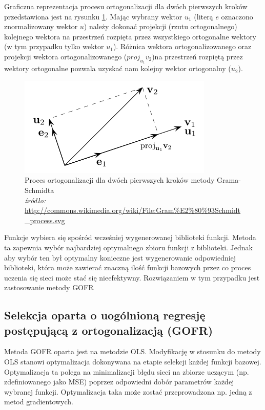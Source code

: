 Graficzna reprezentacja procesu ortogonalizacji dla dwóch pierwszych kroków przedstawiona jest na rysunku \ref{fig:gram}. Mając wybrany wektor $u_1$ (literą $e$ oznaczono znormalizowany wektor $u$) należy dokonać projekcji (rzutu ortogonalnego) kolejnego wektora na przestrzeń rozpięta przez wszystkiego ortogonalne wektory (w tym przypadku tylko wektor $u_1$). Różnica wektora ortogonalizowanego oraz projekcji wektora ortogonalizowanego ($proj_{u_1}v_2$)na przestrzeń rozpiętą przez wektory ortogonalne pozwala uzyskać nam kolejny wektor ortogonalny ($u_2$).
\begin{figure}[ht!]
	\centering
	
	\includegraphics[scale=0.7]{images/GramSchmidt.png}
	\caption{Proces ortogonalizacji dla dwóch pierwszych kroków metody Grama-Schmidta \\
	\footnotesize {\textit{źródło:} \url{http://commons.wikimedia.org/wiki/File:Gram\%E2\%80\%93Schmidt\_process.svg}}}
	\label{fig:gram}	

\end{figure}

Funkcje wybiera się spośród wcześniej wygenerowanej biblioteki funkcji. Metoda ta zapewnia wybór najbardziej optymalnego zbioru funkcji z biblioteki. Jednak aby wybór ten był optymalny konieczne jest wygenerowanie odpowiedniej biblioteki, która może zawierać znaczną ilość funkcji bazowych przez co proces uczenia się sieci może stać się nieefektywny. Rozwiązaniem w tym przypadku jest zastosowanie metody GOFR

\subsection{Selekcja oparta o uogólnioną regresję postępującą z ortogonalizacją (GOFR)}
Metoda GOFR oparta jest na metodzie OLS\cite{Duboisa}. Modyfikację w stosunku do metody OLS stanowi optymalizacja dokonywana na etapie selekcji każdej funkcji bazowej. Optymalizacja ta polega na minimalizacji błędu sieci na zbiorze uczącym (np. zdefiniowanego jako MSE) poprzez odpowiedni dobór parametrów każdej wybranej funkcji. Optymalizacja taka może zostać przeprowadzona np. jedną z metod gradientowych.

